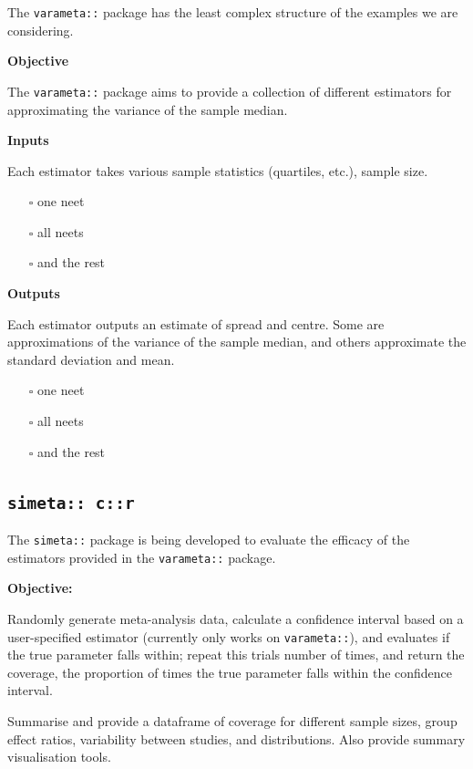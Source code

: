 \documentclass[
]{article}
\providecommand{\tightlist}{%
  \setlength{\itemsep}{0pt}\setlength{\parskip}{0pt}}
\begin{document}
The \texttt{varameta::} package has the least complex structure of the
examples we are considering.

\textbf{Objective}

The \texttt{varameta::} package aims to provide a collection of
different estimators for approximating the variance of the sample
median.

\textbf{Inputs}

Each estimator takes various sample statistics (quartiles, etc.), sample
size.

\begin{itemize}
\tightlist
\item[$\square$]
  one neet
\item[$\square$]
  all neets
\item[$\square$]
  and the rest
\end{itemize}

\textbf{Outputs}

Each estimator outputs an estimate of spread and centre. Some are
approximations of the variance of the sample median, and others
approximate the standard deviation and mean.

\begin{itemize}
\tightlist
\item[$\square$]
  one neet
\item[$\square$]
  all neets
\item[$\square$]
  and the rest
\end{itemize}

\hypertarget{simeta-cr}{%
\subsection{\texorpdfstring{\texttt{simeta::\ c::r}}{simeta:: c::r}}\label{simeta-cr}}

The \texttt{simeta::} package is being developed to evaluate the
efficacy of the estimators provided in the \texttt{varameta::} package.

\textbf{Objective:}

Randomly generate meta-analysis data, calculate a confidence interval
based on a user-specified estimator (currently only works on
\texttt{varameta::}), and evaluates if the true parameter falls within;
repeat this \textbar trials\textbar{} number of times, and return the
coverage, the proportion of times the true parameter falls within the
confidence interval.

Summarise and provide a dataframe of coverage for different sample
sizes, group effect ratios, variability between studies, and
distributions. Also provide summary visualisation tools.
\end{document}
